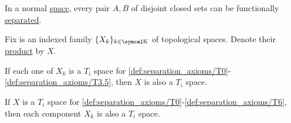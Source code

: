 \begin{lemma}\label{thm:urysohns_lemma}
  In a normal \hyperref[def:separation_axioms/T4]{space}, every pair \( A, B \) of disjoint closed sets can be functionally \hyperref[def:topological_space_separation]{separated}.
\end{lemma}

\begin{theorem}\label{thm:separation_axioms_of_product}
  Fix is an indexed family \( \{ X_k \}_{k \in \CK} \) of topological spaces. Denote their \hyperref[def:topological_product]{product} by \( X \).

  \begin{ThmEnum}
    \cite[theorem 2.3.11]{Engelking1989} If each one of \( X_k \) is a \( T_i \) space for \ref{def:separation_axioms/T0}-\ref{def:separation_axioms/T3.5}, then \( X \) is also a \( T_i \) space.

    \cite[theorem 2.3.11]{Engelking1989} If \( X \) is a \( T_i \) space for \ref{def:separation_axioms/T0}-\ref{def:separation_axioms/T6}, then each component \( X_k \) is also a \( T_i \) space.
  \end{ThmEnum}
\end{theorem}
